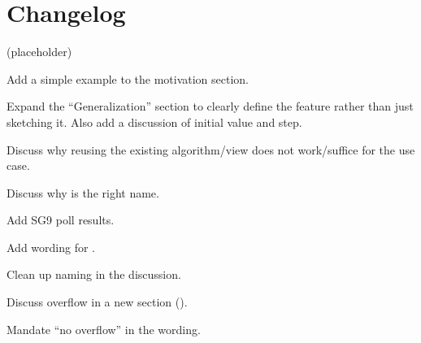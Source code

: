 \section{Changelog}
(placeholder)
\begin{revision}
\item Add a simple example to the motivation section.
\item Expand the “Generalization” section to clearly define the feature rather
  than just sketching it.
  Also add a discussion of initial value and step.
\item Discuss why reusing the existing  algorithm/view does not
  work/suffice for the  use case.
\item Discuss why  is the right name.
\end{revision}

\begin{revision}
\item Add SG9 poll results.
\item Add wording for .
\end{revision}

\begin{revision}
\item Clean up naming in the discussion.
\item Discuss overflow in a new section ().
\item Mandate “no overflow” in the wording.
\end{revision}
